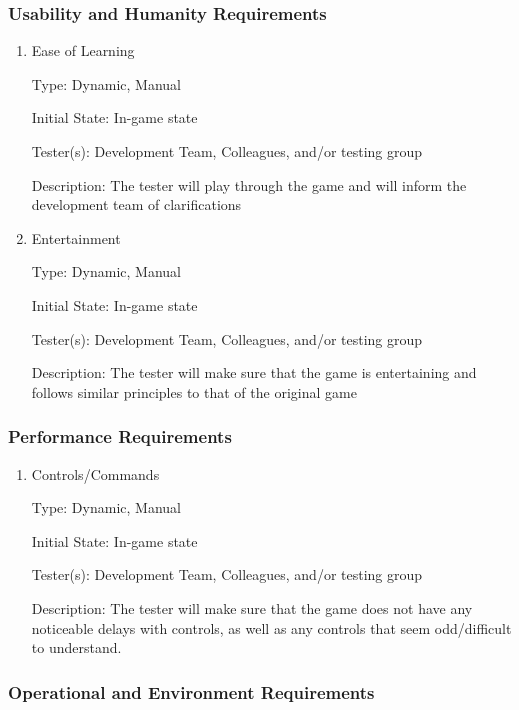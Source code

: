 \documentclass[12pt, titlepage]{article}
\begin{document}
\subsubsection{Usability and Humanity Requirements}

\begin{enumerate}

\item{Ease of Learning\\}

Type: Dynamic, Manual

Initial State: In-game state

Tester(s): Development Team, Colleagues, and/or testing group

Description: The tester will play through the game and will inform the development team of clarifications

\item{Entertainment\\}

Type: Dynamic, Manual

Initial State: In-game state

Tester(s): Development Team, Colleagues, and/or testing group

Description: The tester will make sure that the game is entertaining and follows similar principles to that of the original game

\end{enumerate}

\subsubsection{Performance Requirements}

\begin{enumerate}

\item{Controls/Commands\\}

Type: Dynamic, Manual

Initial State: In-game state

Tester(s): Development Team, Colleagues, and/or testing group

Description: The tester will make sure that the game does not have any noticeable delays with controls, as well as any controls that seem odd/difficult to understand.

\end{enumerate}

\subsubsection{Operational and Environment Requirements}
\end{document}
